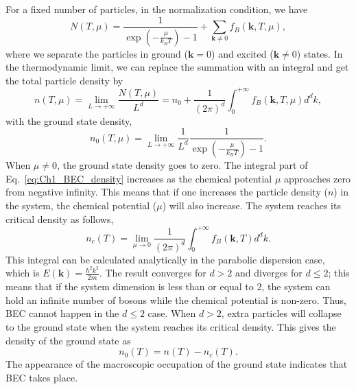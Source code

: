 For a fixed number of particles, in the normalization condition, we have
%
\begin{equation}
    N\left( T,\mu \right) = \frac{1}{\exp\left( -\frac{\mu}{k_B T}\right)-1} + \sum_{\mathbf{k}\neq 0} f_B \left( \mathbf{k},T,\mu\right),
    \label{eq:Ch1_BEC_distribtion}
\end{equation}
%
where we separate the particles in ground ($\mathbf{k}=0$) and excited ($\mathbf{k}\neq 0$) states.
In the thermodynamic limit, we can replace the summation with an integral and get the total particle density by
%
\begin{equation}
    n\left( T, \mu \right) = \lim _{L\to +\infty} \frac{N\left(T,\mu \right)}{L^d} = n_0 + \frac{1}{\left( 2\pi\right)^d} \int_0^{+\infty} f_B \left( \mathbf{k},T,\mu \right) d^d k,
    \label{eq:Ch1_BEC_density}
\end{equation}
with the ground state density,
%
\begin{equation}
    n_0 \left( T,\mu \right) = \lim_{L\to +\infty} \frac{1}{L^d} \frac{1}{\exp\left( -\frac{\mu}{k_B T} \right)-1}.
    \label{eq:Ch1_BEC_density0}
\end{equation}
When $\mu \neq 0$, the ground state density goes to zero.
The integral part of Eq.~\eqref{eq:Ch1_BEC_density} increases as the chemical potential $\mu$ approaches zero from negative infinity.
This means that if one increases the particle density ($n$) in the system, the chemical potential ($\mu$) will also increase.
The system reaches its critical density as follows,
%
\begin{equation}
    n_c\left(T\right) = \lim_{\mu \to 0} \frac{1}{\left( 2\pi \right)^d} \int_{0}^{+\infty} f_B \left( \mathbf{k},T \right)d^d k.
    \label{eq:Ch_1_critical_density}
\end{equation}
This integral can be calculated analytically in the parabolic dispersion case, which is $E\left(\mathbf{k}\right) = \frac{\hbar^2 k^2}{2m}$.
The result converges for $d>2$ and diverges for $d \leq 2$;
this means that if the system dimension is less than or equal to 2, the system can hold an infinite number of bosons while the chemical potential is non-zero.
Thus, BEC cannot happen in the $d \leq 2$ case.
When $d>2$, extra particles will collapse to the ground state when the system reaches its critical density.
This gives the density of the ground state as
%
\begin{equation}
    n_0\left(T\right) = n\left(T\right) -n_c\left(T\right).
    \label{eq:Ch1_groundstate_density}
\end{equation}
%
The appearance of the macroscopic occupation of the ground state indicates that BEC takes place.

